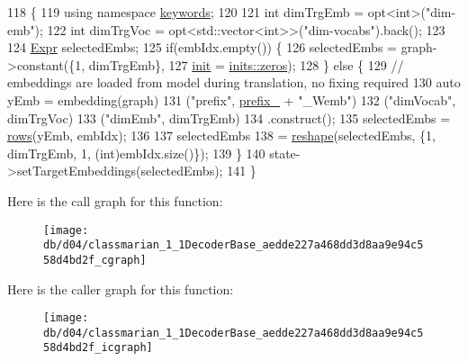 \begin{DoxyCode}
118                                                                  \{
119     \textcolor{keyword}{using namespace }\hyperlink{namespacekeywords}{keywords};
120 
121     \textcolor{keywordtype}{int} dimTrgEmb = opt<int>(\textcolor{stringliteral}{"dim-emb"});
122     \textcolor{keywordtype}{int} dimTrgVoc = opt<std::vector<int>>(\textcolor{stringliteral}{"dim-vocabs"}).back();
123 
124     \hyperlink{namespacemarian_a498d8baf75b754011078b890b39c8e12}{Expr} selectedEmbs;
125     \textcolor{keywordflow}{if}(embIdx.empty()) \{
126       selectedEmbs = graph->constant(\{1, dimTrgEmb\},
127                                      \hyperlink{amunmt_8cpp_a2e8ddb8bd2f3405f554c9f2c52277f4b}{init} = \hyperlink{namespacemarian_1_1inits_a1bd34fd256e3df7bb1e27955a7f2b359}{inits::zeros});
128     \} \textcolor{keywordflow}{else} \{
129       \textcolor{comment}{// embeddings are loaded from model during translation, no fixing required}
130       \textcolor{keyword}{auto} yEmb = embedding(graph)
131                   (\textcolor{stringliteral}{"prefix"}, \hyperlink{classmarian_1_1DecoderBase_a043a90801b6bda9a45e309607136e947}{prefix\_} + \textcolor{stringliteral}{"\_Wemb"})
132                   (\textcolor{stringliteral}{"dimVocab"}, dimTrgVoc)
133                   (\textcolor{stringliteral}{"dimEmb"}, dimTrgEmb)
134                   .construct();
135       selectedEmbs = \hyperlink{namespacemarian_ace1e9a63d52edc363d70d661cf8d0257}{rows}(yEmb, embIdx);
136 
137       selectedEmbs
138           = \hyperlink{namespacemarian_acd984f43188d0ae23c2a6ef13ae5293f}{reshape}(selectedEmbs, \{1, dimTrgEmb, 1, (int)embIdx.size()\});
139     \}
140     state->setTargetEmbeddings(selectedEmbs);
141   \}
\end{DoxyCode}


Here is the call graph for this function\+:
\nopagebreak
\begin{figure}[H]
\begin{center}
\leavevmode
\texttt{[image: db/d04/classmarian\_1\_1DecoderBase\_aedde227a468dd3d8aa9e94c558d4bd2f\_cgraph]}
\end{center}
\end{figure}




Here is the caller graph for this function\+:
\nopagebreak
\begin{figure}[H]
\begin{center}
\leavevmode
\texttt{[image: db/d04/classmarian\_1\_1DecoderBase\_aedde227a468dd3d8aa9e94c558d4bd2f\_icgraph]}
\end{center}
\end{figure}


